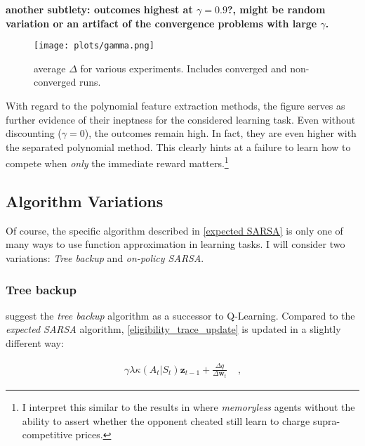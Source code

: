 \textbf{another subtlety: outcomes highest at $\gamma = 0.9$?, might be random variation or an artifact of the convergence problems with large $\gamma$. }

\begin{figure}
	\texttt{[image: plots/gamma.png]}
	\caption{average $\Delta$ for various experiments. Includes converged and non-converged runs.}
	\label{gamma}
\end{figure}

With regard to the polynomial feature extraction methods, the figure serves as further evidence of their ineptness for the considered learning task. Even without discounting ($\gamma = 0$), the outcomes remain high. In fact, they are even higher with the separated polynomial method. This clearly hints at a failure to learn how to compete when \emph{only} the immediate reward matters.\footnote{I interpret this similar to the results in \textcite{waltman_q-learning_2008} where \emph{memoryless} agents without the ability to assert whether the opponent cheated still learn to charge supra-competitive prices.}

\subsection{Algorithm Variations}\label{vary_algorithm}

Of course, the specific algorithm described in \autoref{expected SARSA} is only one of many ways to use function approximation in learning tasks. I will consider two variations: \emph{Tree backup} and \emph{on-policy SARSA}.

\subsubsection{Tree backup}

\textcite{precup} suggest the \emph{tree backup} algorithm as a successor to Q-Learning. Compared to the \emph{expected SARSA} algorithm, \autoref{eligibility_trace_update} is updated in a slightly different way:

\begin{gather}\label{eligibility_traces_tree_backup}
\gamma \lambda \kappa(A_t | S_t) \boldsymbol{z}_{t-1} + \frac{\Delta \hat{q}}{\Delta \boldsymbol{w}_t} ~~~~~ \text{,}
\end{gather}

